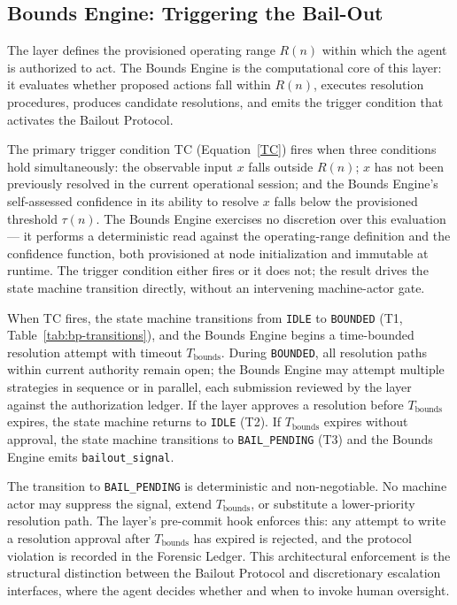 \subsection{Bounds Engine: Triggering the Bail-Out}
\label{sec:bailout-bounds-engine}

The \boundsLayer{} layer defines the provisioned operating range $R(n)$ within
which the agent is authorized to act.  The Bounds Engine is the computational
core of this layer: it evaluates whether proposed actions fall within $R(n)$,
executes resolution procedures, produces candidate resolutions, and emits the
trigger condition that activates the Bailout Protocol.

The primary trigger condition TC (Equation~\ref{TC}) fires when three
conditions hold simultaneously: the observable input $x$ falls outside $R(n)$;
$x$ has not been previously resolved in the current operational session; and
the Bounds Engine's self-assessed confidence in its ability to resolve $x$
falls below the provisioned threshold $\tau(n)$.  The Bounds Engine exercises
no discretion over this evaluation --- it performs a deterministic read against
the operating-range definition and the confidence function, both provisioned at
node initialization and immutable at runtime.  The trigger condition either
fires or it does not; the result drives the state machine transition directly,
without an intervening machine-actor gate.

When TC fires, the state machine transitions from \texttt{IDLE} to
\texttt{BOUNDED} (T1, Table~\ref{tab:bp-transitions}), and the Bounds Engine
begins a time-bounded resolution attempt with timeout $T_{\text{bounds}}$.
During \texttt{BOUNDED}, all resolution paths within current authority remain
open; the Bounds Engine may attempt multiple strategies in sequence or in
parallel, each submission reviewed by the \factLayer{} layer against the
authorization ledger.  If the \factLayer{} layer approves a resolution before
$T_{\text{bounds}}$ expires, the state machine returns to \texttt{IDLE} (T2).
If $T_{\text{bounds}}$ expires without approval, the state machine
transitions to \texttt{BAIL\_PENDING} (T3) and the Bounds Engine emits
\texttt{bailout\_signal}.

The transition to \texttt{BAIL\_PENDING} is deterministic and non-negotiable.
No machine actor may suppress the signal, extend $T_{\text{bounds}}$, or
substitute a lower-priority resolution path.  The \factLayer{} layer's pre-commit
hook enforces this: any attempt to write a resolution approval after
$T_{\text{bounds}}$ has expired is rejected, and the protocol violation is
recorded in the Forensic Ledger.  This architectural enforcement is the
structural distinction between the Bailout Protocol and discretionary escalation
interfaces, where the agent decides whether and when to invoke human oversight.

